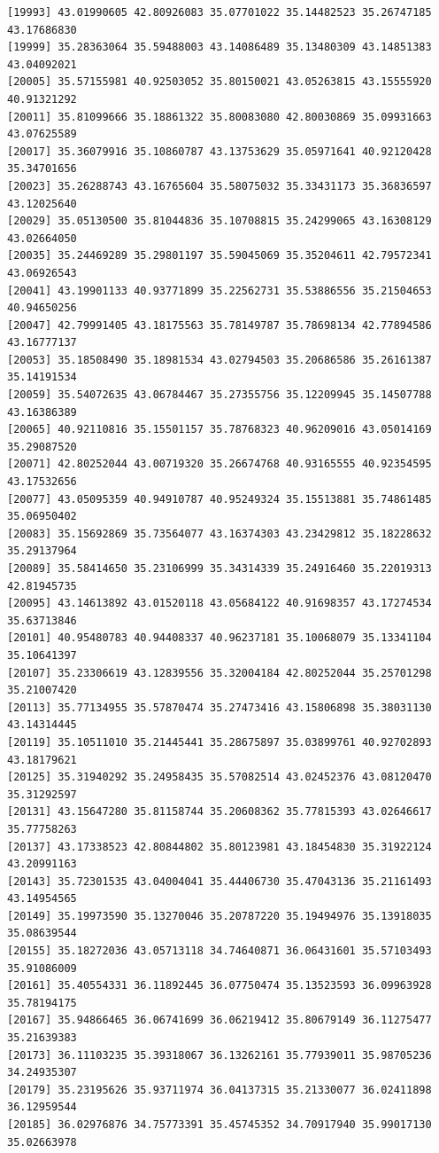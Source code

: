 \documentclass[
  letterpaper,
  DIV=11,
  numbers=noendperiod]{scrartcl}
\begin{document}
\begin{verbatim}
[19993] 43.01990605 42.80926083 35.07701022 35.14482523 35.26747185 43.17686830
[19999] 35.28363064 35.59488003 43.14086489 35.13480309 43.14851383 43.04092021
[20005] 35.57155981 40.92503052 35.80150021 43.05263815 43.15555920 40.91321292
[20011] 35.81099666 35.18861322 35.80083080 42.80030869 35.09931663 43.07625589
[20017] 35.36079916 35.10860787 43.13753629 35.05971641 40.92120428 35.34701656
[20023] 35.26288743 43.16765604 35.58075032 35.33431173 35.36836597 43.12025640
[20029] 35.05130500 35.81044836 35.10708815 35.24299065 43.16308129 43.02664050
[20035] 35.24469289 35.29801197 35.59045069 35.35204611 42.79572341 43.06926543
[20041] 43.19901133 40.93771899 35.22562731 35.53886556 35.21504653 40.94650256
[20047] 42.79991405 43.18175563 35.78149787 35.78698134 42.77894586 43.16777137
[20053] 35.18508490 35.18981534 43.02794503 35.20686586 35.26161387 35.14191534
[20059] 35.54072635 43.06784467 35.27355756 35.12209945 35.14507788 43.16386389
[20065] 40.92110816 35.15501157 35.78768323 40.96209016 43.05014169 35.29087520
[20071] 42.80252044 43.00719320 35.26674768 40.93165555 40.92354595 43.17532656
[20077] 43.05095359 40.94910787 40.95249324 35.15513881 35.74861485 35.06950402
[20083] 35.15692869 35.73564077 43.16374303 43.23429812 35.18228632 35.29137964
[20089] 35.58414650 35.23106999 35.34314339 35.24916460 35.22019313 42.81945735
[20095] 43.14613892 43.01520118 43.05684122 40.91698357 43.17274534 35.63713846
[20101] 40.95480783 40.94408337 40.96237181 35.10068079 35.13341104 35.10641397
[20107] 35.23306619 43.12839556 35.32004184 42.80252044 35.25701298 35.21007420
[20113] 35.77134955 35.57870474 35.27473416 43.15806898 35.38031130 43.14314445
[20119] 35.10511010 35.21445441 35.28675897 35.03899761 40.92702893 43.18179621
[20125] 35.31940292 35.24958435 35.57082514 43.02452376 43.08120470 35.31292597
[20131] 43.15647280 35.81158744 35.20608362 35.77815393 43.02646617 35.77758263
[20137] 43.17338523 42.80844802 35.80123981 43.18454830 35.31922124 43.20991163
[20143] 35.72301535 43.04004041 35.44406730 35.47043136 35.21161493 43.14954565
[20149] 35.19973590 35.13270046 35.20787220 35.19494976 35.13918035 35.08639544
[20155] 35.18272036 43.05713118 34.74640871 36.06431601 35.57103493 35.91086009
[20161] 35.40554331 36.11892445 36.07750474 35.13523593 36.09963928 35.78194175
[20167] 35.94866465 36.06741699 36.06219412 35.80679149 36.11275477 35.21639383
[20173] 36.11103235 35.39318067 36.13262161 35.77939011 35.98705236 34.24935307
[20179] 35.23195626 35.93711974 36.04137315 35.21330077 36.02411898 36.12959544
[20185] 36.02976876 34.75773391 35.45745352 34.70917940 35.99017130 35.02663978

\end{verbatim}
\end{document}
